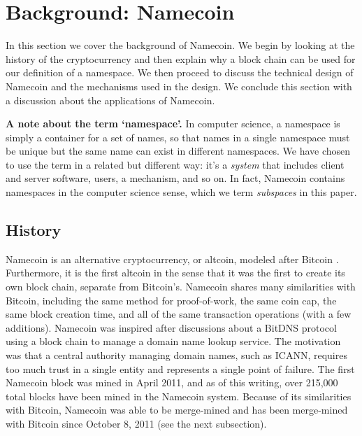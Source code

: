\section{Background: Namecoin}
\label{sec:background}

In this section we cover the background of Namecoin. We begin by looking at the history of the cryptocurrency and then explain why a block chain can be used for our definition of a namespace. We then proceed to discuss the technical design of Namecoin and the mechanisms used in the design. We conclude this section with a discussion about the applications of Namecoin.

{\bf A note about the term `namespace'.} In computer science, a namespace is simply a container for a set of names, so that names in a single namespace must be unique but the same name can exist in different namespaces. We have chosen to use the term in a related but different way: it's a {\em system} that includes client and server software, users, a mechanism, and so on. In fact, Namecoin contains namespaces in the computer science sense, which we term {\em subspaces} in this paper.

\subsection{History}

Namecoin is an alternative cryptocurrency, or altcoin, modeled after Bitcoin \cite{nakamoto2008bitcoin}. Furthermore, it is the first altcoin in the sense that it was the first to create its own block chain, separate from Bitcoin's.  Namecoin shares many similarities with Bitcoin, including the same method for proof-of-work, the same coin cap, the same block creation time, and all of the same transaction operations (with a few additions). Namecoin was inspired after discussions about a BitDNS \cite{bitdns} protocol using a block chain to manage a domain name lookup service. The motivation was that a central authority managing domain names, such as ICANN, requires too much trust in a single entity and represents a single point of failure. The first Namecoin block was mined in April 2011, and as of this writing, over 215,000 total blocks have been mined in the Namecoin system. Because of its similarities with Bitcoin, Namecoin was able to be merge-mined and has been merge-mined with Bitcoin since October 8, 2011 (see the next subsection). 

